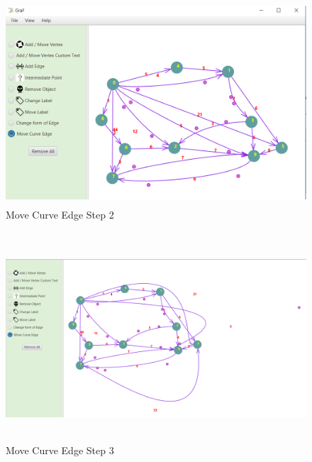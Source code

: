 \documentclass[a4paper,10pt]{article}
\begin{document}
\paragraph{}
\begin{figure}[H]
		\centering
		\includegraphics[height = 3in]{moveCurveEdge2.png}
		\caption[Optional caption]{Move Curve Edge Step 2}
		\label{fig:Repository}
	\end{figure}
\paragraph{}
\begin{figure}[H]
		\centering
		\includegraphics[height = 3in]{moveCurveEdge3.png}
		\caption[Optional caption]{Move Curve Edge Step 3}
		\label{fig:Repository}
	\end{figure}
\paragraph{}	
\end{document}
